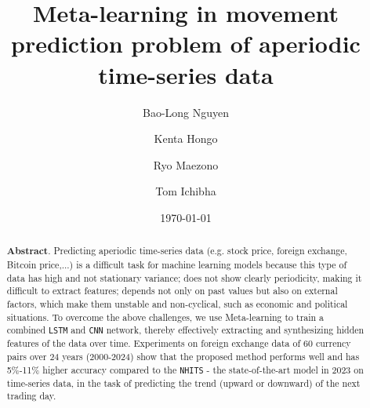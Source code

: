\documentclass[aps,prb,groupedaddress,twocolumn,showpacs,dvipdfmx,superscriptaddress,pdftex]{revtex4-2}
\begin{document}
\title{
    Meta-learning in movement prediction problem of aperiodic time-series data
}
\author{Bao-Long Nguyen}
%
\author{Kenta Hongo}
%
\author{Ryo Maezono}
%
\author{Tom Ichibha}
%
\date{\today}
\begin{abstract}

    \textbf{Abstract}. Predicting aperiodic time-series data (e.g. stock price, foreign exchange, Bitcoin price,...) is a difficult task for machine learning models because this type of data has high and not stationary variance; does not show clearly periodicity, making it difficult to extract features; depends not only on past values but also on external factors, which make them unstable and non-cyclical, such as economic and political situations. To overcome the above challenges, we use Meta-learning to train a combined \verb|LSTM| and \verb|CNN| network, thereby effectively extracting and synthesizing hidden features of the data over time. Experiments on foreign exchange data of 60 currency pairs over 24 years (2000-2024) show that the proposed method performs well and has 5\%-11\% higher accuracy compared to the \verb|NHITS| - the state-of-the-art model in 2023 on time-series data, in the task of predicting the trend (upward or downward) of the next trading day.

\end{abstract}
\maketitle
\end{document}
